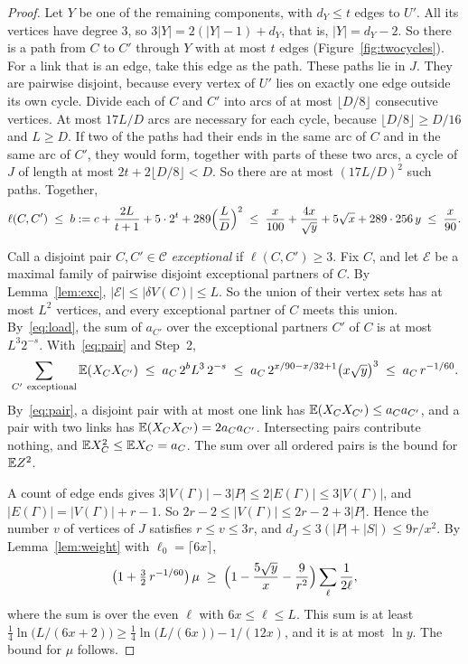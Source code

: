 \begin{proof}
Let $Y$ be one of the remaining components, with $d_Y\le t$ edges to $U'$. All its vertices have
degree $3$, so $3|Y|=2(|Y|-1)+d_Y$, that is, $|Y|=d_Y-2$. So there is a path from $C$ to $C'$
through $Y$ with at most $t$ edges (Figure~\ref{fig:twocycles}). For a link that is an edge,
take this edge as the path. These
paths lie in $J$. They are pairwise disjoint, because every vertex of $U'$ lies on exactly one
edge outside its own cycle. Divide each of $C$ and $C'$ into arcs of at most $\lfloor D/8\rfloor$
consecutive vertices. At most $17L/D$ arcs are necessary for each cycle, because
$\lfloor D/8\rfloor\ge D/16$ and $L\ge D$. If two of the paths had their ends in the same arc of
$C$ and in the same arc of $C'$, they would form, together with parts of these two arcs, a cycle
of $J$ of length at most $2t+2\lfloor D/8\rfloor<D$. So there are at most $(17L/D)^{2}$ such
paths. Together,
\[
  \ell(C,C')\;\le\;b:=c+\frac{2L}{t+1}+5\cdot2^{t}+289\Bigl(\frac LD\Bigr)^{2}
  \;\le\;\frac{x}{100}+\frac{4x}{\sqrt y}+5\sqrt x+289\cdot256\,y\;\le\;\frac{x}{90}.
\]

 Call a disjoint pair $C,C'\in\mathcal{C}$ \emph{exceptional} if
$\ell(C,C')\ge3$. Fix $C$, and let $\mathcal{E}$ be a maximal family of pairwise disjoint
exceptional partners of $C$. By Lemma~\ref{lem:exc}, $|\mathcal{E}|\le|\delta V(C)|\le L$. So the
union of their vertex sets has at most $L^{2}$ vertices, and every exceptional partner of $C$
meets this union. By~\eqref{eq:load}, the sum of $a_{C'}$ over the exceptional partners $C'$ of $C$
is at most $L^{3}2^{-s}$. With~\eqref{eq:pair} and Step~2,
\[
  \sum_{C'\ \mathrm{exceptional}}\EE(X_CX_{C'})\;\le\;a_C\,2^{b}L^{3}\,2^{-s}
  \;\le\;a_C\,2^{x/90-x/32+1}\bigl(x\sqrt y\bigr)^{3}\;\le\;a_C\,r^{-1/60}.
\]
By~\eqref{eq:pair}, a disjoint pair with at most one link has $\mathbb{E}(X_CX_{C'})\le a_Ca_{C'}$, and
a pair with two links has $\mathbb{E}(X_CX_{C'})=2a_Ca_{C'}$. Intersecting pairs contribute nothing, and
$\mathbb{E} X_C^{2}\le\mathbb{E} X_C=a_C$. The sum over all ordered pairs is the bound for $\mathbb{E} Z^{2}$.

 A count of edge ends gives
$3|V(\Gamma)|-3|P|\le2|E(\Gamma)|\le3|V(\Gamma)|$, and $|E(\Gamma)|=|V(\Gamma)|+r-1$. So
$2r-2\le|V(\Gamma)|\le2r-2+3|P|$. Hence the number $v$ of vertices of $J$ satisfies
$r\le v\le3r$, and $d_J\le3(|P|+|S|)\le9r/x^{2}$. By Lemma~\ref{lem:weight} with
$\ell_0=\lceil6x\rceil$,
\[
  \bigl(1+\tfrac32\,r^{-1/60}\bigr)\,\mu\;\ge\;
  \Bigl(1-\frac{5\sqrt y}{x}-\frac{9}{r^{2}}\Bigr)\sum_{\ell}\frac1{2\ell},
\]
where the sum is over the even $\ell$ with $6x\le\ell\le L$. This sum is at least
$\frac14\ln\bigl(L/(6x+2)\bigr)\ge\frac14\ln\bigl(L/(6x)\bigr)-1/(12x)$, and it is at most $\ln y$.
The bound for $\mu$ follows.
\end{proof}

